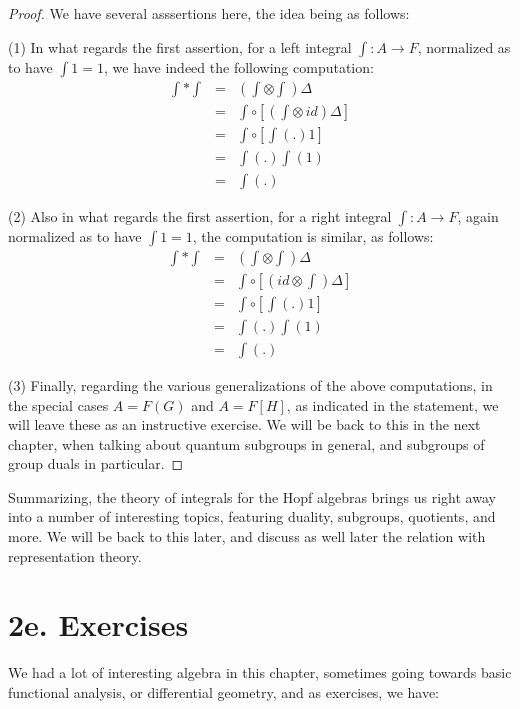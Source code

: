 \documentclass[12pt]{amsbook}
\begin{document}
\begin{proof}
We have several asssertions here, the idea being as follows:

\medskip

(1) In what regards the first assertion, for a left integral $\int:A\to F$, normalized as to have $\int 1=1$, we have indeed the following computation:
\begin{eqnarray*}
\int*\int
&=&\left(\int\otimes\int\right)\Delta\\
&=&\int\circ\left[\left(\int\otimes\,id\right)\Delta\right]\\
&=&\int\circ\left[\int(.)1\right]\\
&=&\int(.)\int(1)\\
&=&\int(.)
\end{eqnarray*}

(2) Also in what regards the first assertion,  for a right integral $\int:A\to F$, again normalized as to have $\int 1=1$, the computation is similar, as follows:
\begin{eqnarray*}
\int*\int
&=&\left(\int\otimes\int\right)\Delta\\
&=&\int\circ\left[\left(id\otimes\int\right)\Delta\right]\\
&=&\int\circ\left[\int(.)1\right]\\
&=&\int(.)\int(1)\\
&=&\int(.)
\end{eqnarray*}

(3) Finally, regarding the various generalizations of the above computations, in the special cases $A=F(G)$ and $A=F[H]$, as indicated in the statement, we will leave these as an instructive exercise. We will be back to this in the next chapter, when talking about quantum subgroups in general, and subgroups of group duals in particular.
\end{proof}

Summarizing, the theory of integrals for the Hopf algebras brings us right away into a number of interesting topics, featuring duality, subgroups, quotients, and more. We will be back to this later, and discuss as well later the relation with representation theory.

\section*{2e. Exercises}

We had a lot of interesting algebra in this chapter, sometimes going towards basic functional analysis, or differential geometry, and as exercises, we have:
\end{document}
